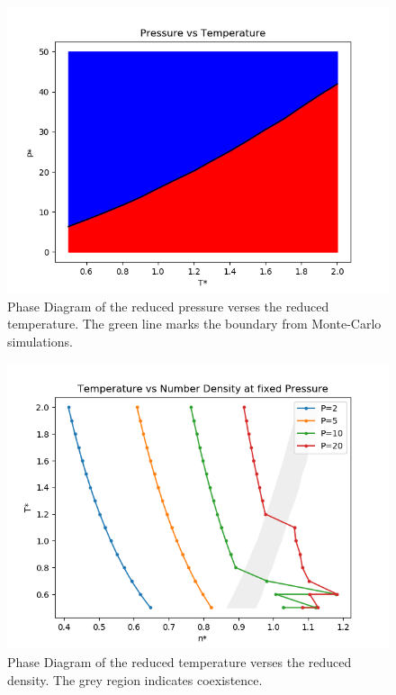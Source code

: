 \documentclass[letterpaper,twocolumn,amsmath,amssymb,prb]{revtex4-1}
\begin{document}
\begin{figure}
 \begin{center}
  \includegraphics[width=\columnwidth]{figs/Phase_Diagram_of_P_vs_T}
 \end{center}
\caption{Phase Diagram of the reduced pressure verses the reduced temperature. The green line marks the boundary from Monte-Carlo simulations.}
\label{fig:Phase_Diagram_P_vs_T}
\end{figure}

\begin{figure}
 \begin{center}
  \includegraphics[width=\columnwidth]{figs/T-vs-n_at_fixed_P}
 \end{center}
\caption{Phase Diagram of the reduced temperature verses the reduced density. The grey region indicates coexistence.}
\label{fig:T-vs-n_at_fixed_P}
\end{figure}
\end{document}
